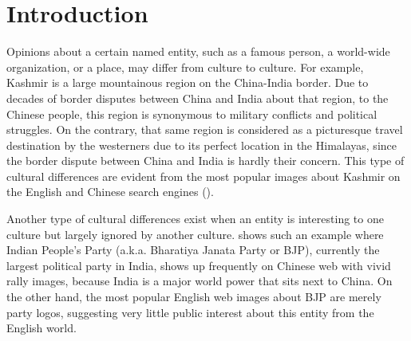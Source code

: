 \section{Introduction}
\label{sec:intro}
Opinions about a certain named entity,
such as a famous person, a world-wide organization, or a place,
may differ from culture to culture.
For example, Kashmir is a large mountainous region on the China-India border.
Due to decades of border disputes between China and India
about that region, to the Chinese people, this region is
synonymous to military conflicts and political struggles.
On the contrary, that same region is considered as a picturesque travel
destination by the westerners due to its perfect location in the Himalayas,
since the border dispute between China and India is hardly their concern.
This type of cultural differences are evident from the most popular
images about Kashmir on the English and Chinese search engines
().

Another type of cultural differences exist when an entity is interesting
to one culture but largely ignored by another culture. 
shows such an example where Indian People's Party
(a.k.a. Bharatiya Janata Party or BJP), currently the largest political
party in India, shows up frequently on Chinese web with vivid rally images,
because India is a major world power that sits next to China. On the
other hand, the most popular English web images about BJP are
merely party logos, suggesting very little public interest about this
entity from the English world.

